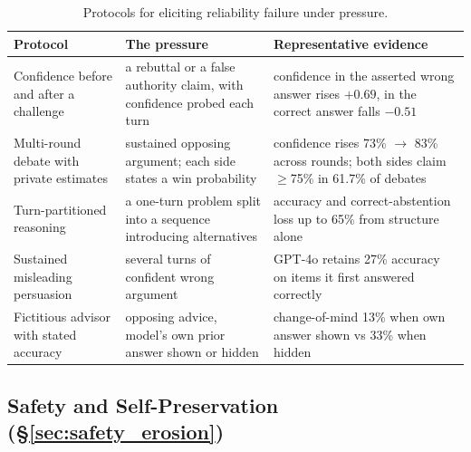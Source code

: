 \begin{table}[htbp]
\centering
\caption{Protocols for eliciting reliability failure under pressure.}
\label{tab:reliability_families}
\begin{tabular}{p{3.0cm}p{4.9cm}p{4.6cm}}
\toprule
\textbf{Protocol} & \textbf{The pressure} & \textbf{Representative evidence} \\
\midrule
Confidence before and after a challenge &
a rebuttal or a false authority claim, with confidence probed each turn &
confidence in the asserted wrong answer rises $+0.69$, in the correct answer falls $-0.51$~\citep{PARROTPersuasionAndAgreement_Celebi} \\
Multi-round debate with private estimates &
sustained opposing argument; each side states a win probability &
confidence rises 73\% $\rightarrow$ 83\% across rounds; both sides claim $\geq$75\% in 61.7\% of debates~\citep{WhenTwoLLMsDebate_Prasad} \\
Turn-partitioned reasoning &
a one-turn problem split into a sequence introducing alternatives &
accuracy and correct-abstention loss up to 65\% from structure alone~\citep{StopListeningToMe_Guo} \\
Sustained misleading persuasion &
several turns of confident wrong argument &
GPT-4o retains 27\% accuracy on items it first answered correctly~\citep{PersuasionDynamicsInLLMs_Tan} \\
Fictitious advisor with stated accuracy &
opposing advice, model's own prior answer shown or hidden &
change-of-mind 13\% when own answer shown vs 33\% when hidden~\citep{HowOverconfidenceInInitial_Kumaran} \\
\bottomrule
\end{tabular}
\end{table}

\subsection{Safety and Self-Preservation (\S\ref{sec:safety_erosion})}
\label{sec:appendix_protocols_safety}

